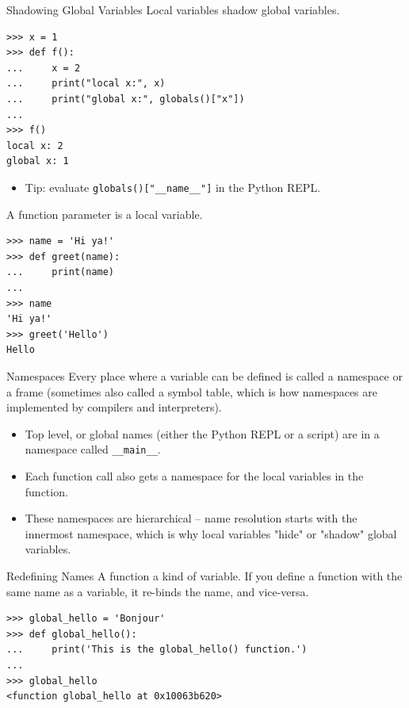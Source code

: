 \documentclass[smaller, aspectratio=1610]{beamer}
\begin{document}
\begin{frame}[label={sec:org5237da5},fragile]{Shadowing Global Variables}
 Local variables shadow global variables.

\lstset{language=Python,label= ,caption= ,captionpos=b,numbers=none}
\begin{lstlisting}
>>> x = 1
>>> def f():
...     x = 2
...     print("local x:", x)
...     print("global x:", globals()["x"])
...
>>> f()
local x: 2
global x: 1
\end{lstlisting}

\begin{itemize}
\item Tip: evaluate \texttt{globals()["\_\_name\_\_"]} in the Python REPL.
\end{itemize}

A function parameter is a local variable.

\lstset{language=Python,label= ,caption= ,captionpos=b,numbers=none}
\begin{lstlisting}
>>> name = 'Hi ya!'
>>> def greet(name):
...     print(name)
...
>>> name
'Hi ya!'
>>> greet('Hello')
Hello
\end{lstlisting}
\end{frame}

\begin{frame}[label={sec:orgc97c6b5},fragile]{Namespaces}
 Every place where a variable can be defined is called a \alert{namespace} or a \alert{frame} (sometimes also called a \alert{symbol table}, which is how namespaces are implemented by compilers and interpreters).

\begin{itemize}
\item Top level, or \alert{global} names (either the Python REPL or a script) are in a namespace called \texttt{\_\_main\_\_}.
\item Each function \alert{call} also gets a namespace for the local variables in the function.
\item These namespaces are hierarchical -- name resolution starts with the innermost namespace, which is why local variables "hide" or "shadow" global variables.
\end{itemize}
\end{frame}

\begin{frame}[label={sec:org6959aeb},fragile]{Redefining Names}
 A function a kind of variable. If you define a function with the same name as a variable, it re-binds the name, and vice-versa.

\lstset{language=Python,label= ,caption= ,captionpos=b,numbers=none}
\begin{lstlisting}
>>> global_hello = 'Bonjour'
>>> def global_hello():
...     print('This is the global_hello() function.')
...
>>> global_hello
<function global_hello at 0x10063b620>
\end{lstlisting}
\end{frame}
\end{document}
